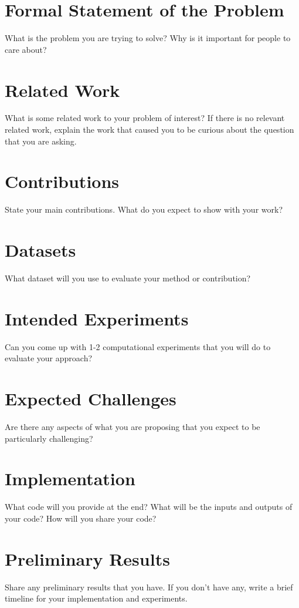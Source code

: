 \documentclass{article}
\begin{document}
\section{Formal Statement of the Problem}
What is the problem you are trying to solve? Why is it important for people to care about?

\section{Related Work}
What is some related work to your problem of interest? If there is no relevant related work, explain the work that caused you to be curious about the question that you are asking. 

\section{Contributions}

State your main contributions. What do you expect to show with your work? 

\section{Datasets}

What dataset will you use to evaluate your method or contribution?

\section{Intended Experiments}
Can you come up with 1-2 computational experiments that you will do to evaluate your approach? 

\section{Expected Challenges}
Are there any aspects of what you are proposing that you expect to be particularly challenging?

\section{Implementation}
What code will you provide at the end? What will be the inputs and outputs of your code? How will you share your code?

\section{Preliminary Results}
Share any preliminary results that you have. If you don't have any, write a brief timeline for your implementation and experiments. 
\end{document}
